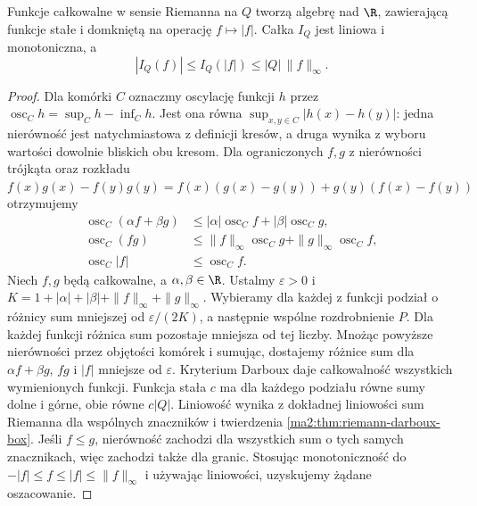 \begin{twierdzenie}
\label{ma2:thm:riemann-box-algebra}
Funkcje całkowalne w sensie Riemanna na $Q$
tworzą algebrę nad $\R$, zawierającą funkcje
stałe i domkniętą na operację $f\mapsto |f|$.
Całka $I_Q$ jest liniowa i monotoniczna, a
\[
 |I_Q(f)|\le I_Q(|f|)\le |Q|\,\|f\|_\infty.
\]
\end{twierdzenie}
\begin{proof}
Dla komórki $C$ oznaczmy oscylację funkcji
$h$ przez $\operatorname{osc}_C h=\sup_C h-\inf_C h$.
Jest ona równa $\sup_{x,y\in C}|h(x)-h(y)|$:
jedna nierówność jest natychmiastowa z definicji
kresów, a druga wynika z wyboru wartości dowolnie
bliskich obu kresom.
Dla ograniczonych $f,g$ z nierówności trójkąta
oraz rozkładu
$f(x)g(x)-f(y)g(y)=f(x)(g(x)-g(y))
+g(y)(f(x)-f(y))$ otrzymujemy
\[
 \begin{aligned}
 \operatorname{osc}_C(\alpha f+\beta g)
 &\le|\alpha|\operatorname{osc}_Cf+
      |\beta|\operatorname{osc}_Cg,\\
 \operatorname{osc}_C(fg)
 &\le\|f\|_\infty\operatorname{osc}_Cg+
      \|g\|_\infty\operatorname{osc}_Cf,\\
 \operatorname{osc}_C|f|&\le\operatorname{osc}_Cf.
 \end{aligned}
\]
Niech $f,g$ będą całkowalne, a $\alpha,\beta\in\R$.
Ustalmy $\varepsilon>0$ i
$K=1+|\alpha|+|\beta|+\|f\|_\infty+\|g\|_\infty$.
Wybieramy dla każdej z funkcji podział o różnicy
sum mniejszej od $\varepsilon/(2K)$, a następnie
wspólne rozdrobnienie $P$. Dla każdej funkcji
różnica sum pozostaje mniejsza od tej liczby.
Mnożąc powyższe nierówności przez objętości
komórek i sumując, dostajemy różnice sum
dla $\alpha f+\beta g$, $fg$ i $|f|$ mniejsze
od $\varepsilon$. Kryterium Darboux daje
całkowalność wszystkich wymienionych funkcji.
Funkcja stała $c$ ma dla każdego podziału
równe sumy dolne i górne, obie równe $c|Q|$.
Liniowość wynika z dokładnej liniowości
sum Riemanna dla wspólnych znaczników
i twierdzenia \ref{ma2:thm:riemann-darboux-box}.
Jeśli $f\le g$, nierówność zachodzi dla
wszystkich sum o tych samych znacznikach,
więc zachodzi także dla granic.
Stosując monotoniczność do
$-|f|\le f\le |f|\le\|f\|_\infty$ i używając
liniowości, uzyskujemy żądane oszacowanie.
\end{proof}

